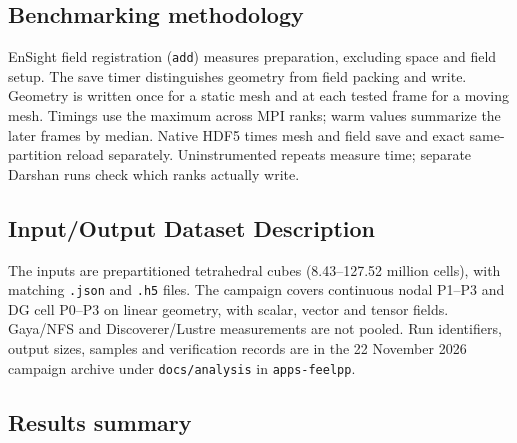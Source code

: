 \subsection{Benchmarking methodology}

EnSight field registration (\texttt{add}) measures preparation, excluding
space and field setup. The save timer distinguishes geometry from field
packing and write. Geometry is written once for a static mesh and at
each tested frame for a moving mesh. Timings use the maximum across MPI
ranks; warm values summarize the later frames by median. Native HDF5
times mesh and field save and exact same-partition reload separately.
Uninstrumented repeats measure time; separate Darshan runs check which
ranks actually write.

\subsection{Input/Output Dataset Description}

The inputs are prepartitioned tetrahedral cubes (8.43--127.52 million
cells), with matching \texttt{.json} and \texttt{.h5} files. The campaign
covers continuous nodal P1--P3 and DG cell P0--P3 on linear geometry,
with scalar, vector and tensor fields. Gaya/NFS and Discoverer/Lustre
measurements are not pooled.
Run identifiers, output sizes, samples and verification records are in
the 22 November 2026 campaign archive under \nolinkurl{docs/analysis}
in \texttt{apps-feelpp}.

\subsection{Results summary}
\label{sec:app:results:app-feelpp-io:november-campaign}


